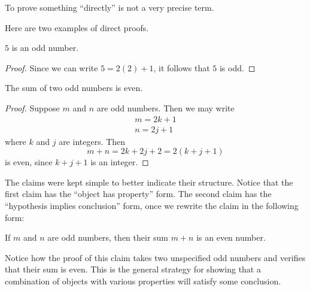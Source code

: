 To prove something ``directly'' is not a very precise term. 

Here are two examples of direct proofs.
\begin{proposition}
$5$ is an odd number.
\end{proposition}
\begin{proof}
Since we can write $5 = 2(2) + 1$, it follows that $5$ is odd.
\end{proof}

\begin{proposition}
The sum of two odd numbers is even.
\end{proposition}
\begin{proof}
Suppose $m$ and $n$ are odd numbers. Then we may write
\begin{gather*}
m = 2k + 1 \\
n = 2j + 1
\end{gather*}
where $k$ and $j$ are integers. Then
\[m + n = 2k + 2j + 2 = 2(k + j + 1)\]
is even, since $k + j + 1$ is an integer.
\end{proof}

The claims were kept simple to better indicate their structure. Notice that the first claim has the ``object has property'' form. The second claim has the ``hypothesis implies conclusion'' form, once we rewrite the claim in the following form:
\begin{proposition}
If $m$ and $n$ are odd numbers, then their sum $m + n$ is an even number.
\end{proposition}
Notice how the proof of this claim takes two unspecified odd numbers and verifies that their sum is even. This is the general strategy for showing that a combination of objects with various properties will satisfy some conclusion. 